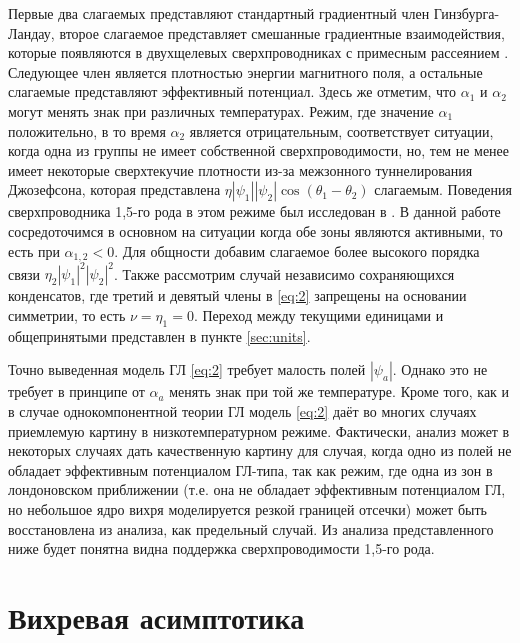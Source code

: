 Первые два слагаемых представляют стандартный градиентный член 
Гинзбурга-Ландау, второе слагаемое представляет смешанные градиентные 
взаимодействия, которые появляются в двухщелевых сверхпроводниках с примесным 
рассеянием \cite{bib:8,bib:9}. Следующее член является плотностью энергии 
магнитного поля, а остальные слагаемые представляют эффективный потенциал. 
Здесь же отметим, что \( \alpha_1 \) и \( \alpha_2 \) могут менять знак 
при различных температурах. Режим, где значение \( \alpha_1 \) положительно, 
в то время \( \alpha_2 \) является отрицательным, соответствует ситуации, 
когда одна из группы не имеет собственной сверхпроводимости, но, тем не менее 
имеет некоторые сверхтекучие плотности из-за межзонного туннелирования 
Джозефсона, которая представлена 
\( \eta|\psi_1||\psi_2|\cos(\theta_1-\theta_2) \) слагаемым. Поведения 
сверхпроводника 1,5-го рода в этом режиме был исследован в \cite{bib:2}. В 
данной работе сосредоточимся в основном на ситуации когда обе зоны являются 
активными, то есть при \( \alpha_{1,2} < 0 \). Для общности добавим слагаемое 
более высокого порядка связи \( \eta_2|\psi_1|^2|\psi_2|^2 \). Также 
рассмотрим случай независимо сохраняющихся конденсатов, где третий и девятый 
члены в \eqref{eq:2} запрещены на основании симметрии, то есть 
\( \nu = \eta_1 = 0 \). Переход между текущими единицами и общепринятыми 
представлен в пункте \ref{sec:units}.

Точно выведенная модель ГЛ \eqref{eq:2} требует малость полей \( |\psi_a| \). 
Однако это не требует в принципе от \( \alpha_a \) менять знак при той же 
температуре. Кроме того, как и в случае однокомпонентной теории ГЛ модель 
\eqref{eq:2} даёт во многих случаях приемлемую картину в низкотемпературном 
режиме. Фактически, анализ может в некоторых случаях дать качественную картину 
для случая, когда одно из полей не обладает эффективным потенциалом ГЛ-типа, 
так как режим, где одна из зон в лондоновском приближении (т.е. она не 
обладает эффективным потенциалом ГЛ, но небольшое ядро вихря моделируется 
резкой границей отсечки) может быть восстановлена из анализа, как предельный 
случай. Из анализа представленного ниже будет понятна видна поддержка 
сверхпроводимости 1,5-го рода.

\section{Вихревая асимптотика}

